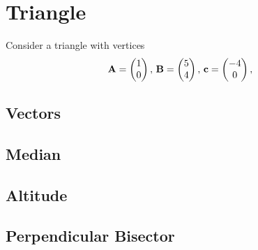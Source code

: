\documentclass[11pt]{book}
\begin{document}
\frontmatter
\tableofcontents
\setcounter{page}{1}
\mainmatter
\chapter{Triangle}
Consider a triangle with vertices
\begin{align}
\label{eq:tri-pts}
\vec{A}=\myvec{1 \\ 0},\,
\vec{B}=\myvec{5\\4},\,
	\vec{c}=\myvec{-4\\0},\,
\end{align}

\section{Vectors}
\section{Median}
\section{Altitude}
\section{Perpendicular Bisector}
\end{document}
